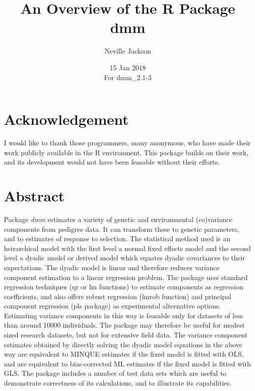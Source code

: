 \documentclass[titlepage]{article}  %
\title{ An Overview of the R Package dmm}
\author{Neville Jackson }
\date{15 Jan 2018 \\
      For dmm\_2.1-3}   %
\begin{document}
 
 
\maketitle      
\tableofcontents

\clearpage
\section{Acknowledgement}
 I would like to thank those programmers, many anonymous, who have made their work
publicly available in the R environment. This package builds on their work, and its
 development would not have been feasable without their efforts.

\clearpage
\section{Abstract}
 Package {\em dmm} estimates a variety of genetic and environmental (co)variance
components from pedigree data. It can transform these to genetic parameters, and to estimates of response to selection. The statistical method used is an heirarchical model with the first level a normal fixed effects model and the second level a dyadic model or derived model which equates dyadic covariances to their expectations. The dyadic model is linear and therefore reduces variance component estimation to a linear regression problem. 
The package uses standard regression techniques (qr or lm functions) to estimate components as regression coefficients, and also offers robust regression (lmrob function) and principal component regression (pls package) as experimental alternative options.
Estimating variance components in this way is feasable only for datasets of less than around 10000 individuals. The package may therefore be useful for modest sized research datasets, but not for extensive field data. The variance component estimates obtained by directly solving the dyadic model equations in the above way are equivalent to MINQUE estimates if the fixed model is fitted with OLS, and are equivalent to bias-corrected ML estimates if the fixed model is fitted with GLS. The package includes a number of test data sets which are useful to demonstrate correctness of its calculations, and to illustrate its capabilities.

\clearpage
\end{document}

